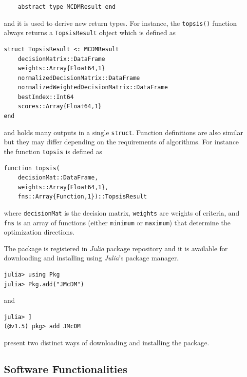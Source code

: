 \documentclass[preprint,review, 12pt, a4paper]{elsarticle}
\begin{document}
\begin{verbatim}
	abstract type MCDMResult end
\end{verbatim}

\noindent and it is used to derive new return types. For instance, the \texttt{topsis()} function always returns a \texttt{TopsisResult} object which is defined as 

\begin{verbatim}
struct TopsisResult <: MCDMResult
    decisionMatrix::DataFrame
    weights::Array{Float64,1}
    normalizedDecisionMatrix::DataFrame
    normalizedWeightedDecisionMatrix::DataFrame 
    bestIndex::Int64 
    scores::Array{Float64,1}
end
\end{verbatim}

\noindent and holds many outputs in a single \texttt{struct}. Function definitions are also similar but they may differ depending on the requirements of algorithms. For instance the function \texttt{topsis} is defined as

\begin{verbatim}
function topsis(
    decisionMat::DataFrame, 
    weights::Array{Float64,1}, 
    fns::Array{Function,1})::TopsisResult
\end{verbatim} 

\noindent where \texttt{decisionMat} is the decision matrix, \texttt{weights} are weights of criteria, and \texttt{fns} is an array of functions (either \texttt{minimum} or \texttt{maximum}) that determine the optimization directions. 

The package is registered in \emph{Julia} package repository and it is available for downloading and installing using \emph{Julia}'s package manager.  

\begin{verbatim}
julia> using Pkg
julia> Pkg.add("JMcDM")
\end{verbatim}

\noindent and 

\begin{verbatim}
julia> ]
(@v1.5) pkg> add JMcDM
\end{verbatim}

\noindent present two distinct ways of downloading and installing the package.


\subsection{Software Functionalities}
\label{section:softwareFunc}
\end{document}
